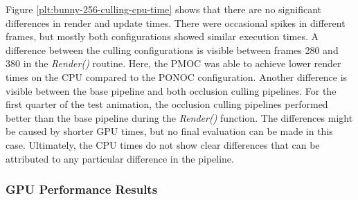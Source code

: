 \noindent
Figure \ref{plt:bunny-256-culling-cpu-time} shows that there are no significant differences in render and update times.
There were occasional spikes in different frames, but mostly both configurations showed similar execution times. A 
difference between the culling configurations is visible between frames 280 and 380 in the \emph{Render()} routine. 
Here, the \ac{PMOC} was able to achieve lower render times on the \ac{CPU} compared to the \ac{PONOC} configuration. 
Another difference is visible between the base pipeline and both occlusion culling pipelines. For the first quarter 
of the test animation, the occlusion culling pipelines performed better than the base pipeline during the \emph{Render()} 
function. The differences might be caused by shorter \ac{GPU} times, but no final evaluation can be made in this case. 
Ultimately, the \ac{CPU} times do not show clear differences that can be attributed to any particular difference in 
the pipeline.

\subsubsection*{GPU Performance Results} \label{subsubsec-gpu-performance-results-bunny}

